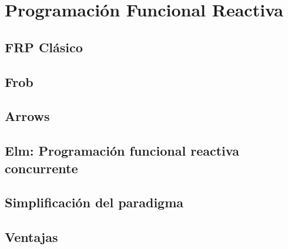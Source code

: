 
\section{Programación Funcional Reactiva}



\subsection{FRP Clásico}


\subsection{Frob}


\subsection{Arrows}


\subsection{Elm: Programación funcional reactiva concurrente}

   
\subsection{Simplificación del paradigma}


\subsection{Ventajas} 


